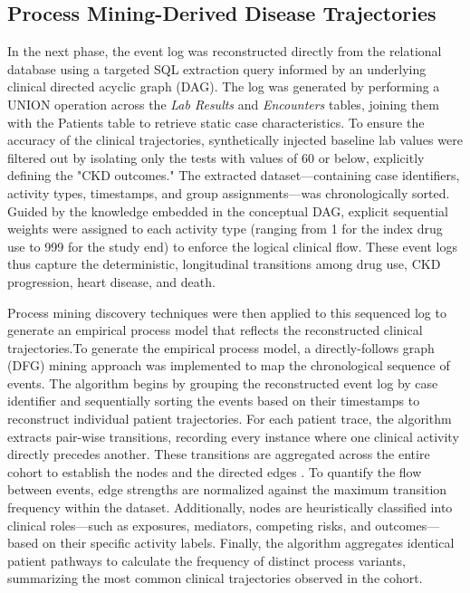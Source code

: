 \documentclass[sn-vancouver-num]{sn-jnl}
\begin{document}
\subsection{Process Mining-Derived Disease Trajectories}
In the next phase, the event log was reconstructed directly from the relational database using a targeted SQL extraction query informed by an underlying clinical directed acyclic graph (DAG). The log was generated by performing a UNION operation across the \textit{Lab Results} and \textit{Encounters} tables, joining them with the Patients table to retrieve static case characteristics. To ensure the accuracy of the clinical trajectories, synthetically injected baseline lab values were filtered out by isolating only the tests with values of 60 or below, explicitly defining the "CKD outcomes." The extracted dataset—containing case identifiers, activity types, timestamps, and group assignments—was chronologically sorted. Guided by the knowledge embedded in the conceptual DAG, explicit sequential weights were assigned to each activity type (ranging from 1 for the index drug use to 999 for the study end) to enforce the logical clinical flow. These event logs thus capture the deterministic, longitudinal transitions among drug use, CKD progression, heart disease, and death. 

Process mining discovery techniques were then applied to this sequenced log to generate an empirical process model that reflects the reconstructed clinical trajectories.To generate the empirical process model, a directly-follows graph (DFG) mining approach was implemented to map the chronological sequence of events. The algorithm begins by grouping the reconstructed event log by case identifier and sequentially sorting the events based on their timestamps to reconstruct individual patient trajectories. For each patient trace, the algorithm extracts pair-wise transitions, recording every instance where one clinical activity directly precedes another. These transitions are aggregated across the entire cohort to establish the nodes and the directed edges . To quantify the flow between events, edge strengths are normalized against the maximum transition frequency within the dataset. Additionally, nodes are heuristically classified into clinical roles—such as exposures, mediators, competing risks, and outcomes—based on their specific activity labels. Finally, the algorithm aggregates identical patient pathways to calculate the frequency of distinct process variants, summarizing the most common clinical trajectories observed in the cohort.
\end{document}
